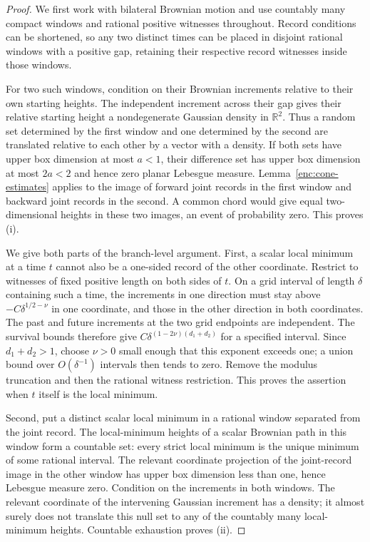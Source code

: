 \documentclass[11pt]{article}
\numberwithin{equation}{section}
\theoremstyle{definition}
\theoremstyle{remark}
\newcommand{\1}{\mathbf 1}
\begin{document}
\begin{proof}
We first work with bilateral Brownian motion and use countably many
compact windows and rational positive witnesses throughout.  Record
conditions can be shortened, so any two distinct times can be placed
in disjoint rational windows with a positive gap, retaining their
respective record witnesses inside those windows.

For two such windows, condition on their Brownian increments relative
to their own starting heights.  The independent increment across their
gap gives their relative starting height a nondegenerate Gaussian
density in $\mathbb R^2$.  Thus a random set determined by the first window and
one determined by the second are translated relative to each other by
a vector with a density.  If both sets have upper box dimension at most
$a<1$, their difference set has upper box dimension at most $2a<2$ and
hence zero planar Lebesgue measure.  Lemma~\ref{enc:cone-estimates}
applies to the image of forward joint records in the first window and
backward joint records in the second.  A common chord would give equal
two-dimensional heights in these two images, an event of probability
zero.  This proves (i).

We give both parts of the branch-level argument.  First, a scalar local
minimum at a time $t$ cannot also be a one-sided record of the other
coordinate.  Restrict to witnesses of fixed positive length on both
sides of $t$.  On a grid interval of length $\delta$ containing such
a time, the increments in one direction must stay above
$-C\delta^{1/2-\nu}$ in one coordinate, and those in the other direction
in both coordinates.  The past and future increments at the two grid
endpoints are independent.  The survival bounds therefore give
$C\delta^{(1-2\nu)(d_1+d_2)}$ for a specified interval.  Since
$d_1+d_2>1$, choose $\nu>0$ small enough that this exponent exceeds
one; a union bound over $O(\delta^{-1})$ intervals then tends to
zero.  Remove the modulus truncation and then the rational witness
restriction.  This proves the assertion when $t$ itself is the local
minimum.

Second, put a distinct scalar local minimum in a rational window
separated from the joint record.  The local-minimum heights of a scalar
Brownian path in this window form a countable set: every strict local
minimum is the unique minimum of some rational interval.  The relevant
coordinate projection of the joint-record image in the other window
has upper box dimension less than one, hence Lebesgue measure zero.
Condition on the increments in both windows.  The relevant coordinate
of the intervening Gaussian increment has a density; it almost surely
does not translate this null set to any of the countably many
local-minimum heights.  Countable exhaustion proves (ii).


\end{proof}
\end{document}
